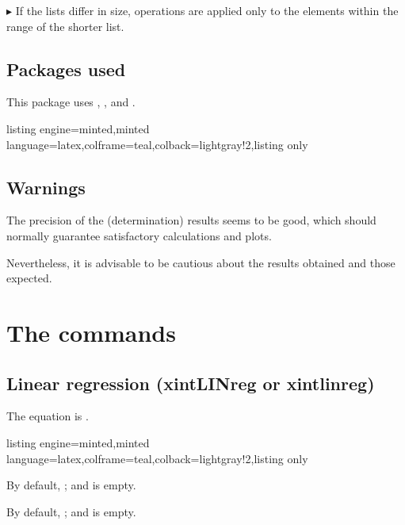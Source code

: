\documentclass[11pt,a4paper]{ltxdoc}
\begin{document}
\medskip

$\blacktriangleright$ If the lists differ in size, operations are applied only to the elements within the range of the shorter list.

\subsection{Packages used}

This package uses , ,  and .

\begin{tcblisting}{listing engine=minted,minted language=latex,colframe=teal,colback=lightgray!2,listing only}
\usepackage{xint-regression}
\end{tcblisting}

\subsection{Warnings}

The precision of the (determination) results seems to be good, which should normally guarantee satisfactory calculations and plots.

Nevertheless, it is advisable to be cautious about the results obtained and those expected.

\pagebreak

\section{The commands}

\subsection{Linear regression (xintLINreg or xintlinreg)}

The equation is .

\begin{tcblisting}{listing engine=minted,minted language=latex,colframe=teal,colback=lightgray!2,listing only}
\end{tcblisting}

By default, ;  and  is empty.

By default, ;  and  is empty.
\end{document}
